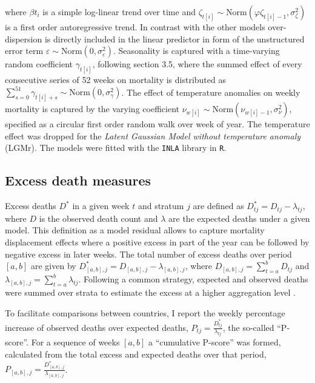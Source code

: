 \documentclass[10pt,letterpaper]{article}
\begin{document}
where $\beta t_i$ is a simple log-linear trend over time and $\zeta_{t[i]} \sim \text{Norm}(\varphi \zeta_{t[i]-1}, \sigma^2_\zeta)$ is a first order autoregressive trend. In contrast with the other models over-dispersion is directly included in the linear predictor in form of the unstructured error term $\varepsilon \sim \text{Norm}(0, \sigma^2_\varepsilon)$. Seasonality is captured with a time-varying random coefficient $\gamma_{t[i]}$, following \cite{Rue2005} section 3.5, where the summed effect of every consecutive series of 52 weeks on mortality is distributed as $\sum_{s=0}^{51} \gamma_{t[i]+s} \sim \text{Norm}(0, \sigma^2_\gamma)$. The effect of temperature anomalies on weekly mortality is captured by the varying coefficient $\nu_{w[i]} \sim \text{Norm}(\nu_{w[i]-1}, \sigma^2_\nu)$, specified as a circular first order random walk over week of year. The temperature effect was dropped for the \emph{Latent Gaussian Model without temperature anomaly} (LGMr). The models were fitted with the \texttt{INLA} library \cite{Rue2009, Rue2021} in \texttt{R}.

\subsection*{Excess death measures}

Excess deaths $D^*$ in a given week $t$ and stratum $j$ are defined as
$D_{tj}^* = D_{tj}-\lambda_{tj}$,
where $D$ is the observed death count and $\lambda$ are the expected deaths under a given model. This definition as a model residual allows to capture mortality displacement effects where a positive excess in part of the year can be followed by negative excess in later weeks. The total number of excess deaths over period $[a,b]$ are given by
$D_{[a,b], j}^* = D_{[a,b], j} - \lambda_{[a,b], j}$,
where
$D_{[a,b], j}=\sum_{t=a}^b D_{tj}$ and
$\lambda_{[a,b], j}=\sum_{t=a}^b \lambda_{tj}$.
Following a common strategy, expected and observed deaths were summed over strata to estimate the excess at a higher aggregation level \cite{Barnard2020, Aburto2021, Kontis2020, Weinberger2020}.

To facilitate comparisons between countries, I report the weekly percentage increase of observed deaths over expected deaths,
$P_{tj}=\frac{D_{tj}^*}{\lambda_{tj}}$,
the so-called ``P-score''. For a sequence of weeks $[a,b]$ a ``cumulative P-score'' was formed, calculated from the total excess and expected deaths over that period,
$P_{[a,b], j}=\frac {D_{[a,b], j}^*} {\lambda_{[a,b], j}}$.
\end{document}

